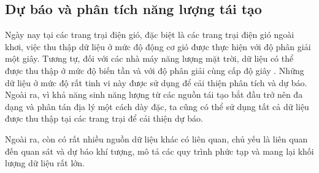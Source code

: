 \documentclass[utf8]{frontiersSCNS} %
\begin{document}
\subsection{Dự báo và phân tích năng lượng tái tạo}

Ngày nay tại các trang trại điện gió, đặc biệt là các trang trại điện gió ngoài khơi, việc thu thập dữ liệu ở mức độ động cơ gió được thực hiện với độ phân giải một giây. Tương tự, đối với các nhà máy năng lượng mặt trời, dữ liệu có thể được thu thập ở mức độ biến tần và với độ phân giải cùng cấp độ giây \citep{Gilbert2020}. Những dữ liệu ở mức độ rất tinh vi này được sử dụng để cải thiện phân tích và dự báo. Ngoài ra, vì khả năng sinh năng lượng từ các nguồn tái tạo bắt đầu trở nên đa dạng và phân tán địa lý một cách dày đặc, ta cũng có thể sử dụng tất cả dữ liệu được thu thập tại các trang trại để cải thiện dự báo.

Ngoài ra, còn có rất nhiều nguồn dữ liệu khác có liên quan, chủ yếu là liên quan đến quan sát và dự báo khí tượng, mô tả các quy trình phức tạp và mang lại khối lượng dữ liệu rất lớn. %
\end{document}
